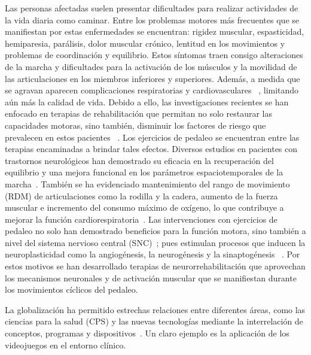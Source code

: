\begin{introduction}
    \vspace{5pt}
    Las personas afectadas suelen presentar dificultades para realizar actividades de la vida diaria como caminar. Entre los problemas motores más frecuentes que se manifiestan por estas enfermedades se encuentran: rigidez muscular, espasticidad, hemiparesia, parálisis, dolor muscular crónico, lentitud en los movimientos y problemas de coordinación y equilibrio. Estos síntomas traen consigo alteraciones de la marcha y dificultades para la activación de los músculos y la movilidad de las articulaciones en los miembros inferiores y superiores. Además, a medida que se agravan aparecen complicaciones respiratorias y cardiovasculares ~\cite{barbosa2015application, miner2020therapeutic}, limitando aún más la calidad de vida. Debido a ello, las investigaciones recientes se han enfocado en terapias de rehabilitación que permitan no solo restaurar las capacidades motoras, sino también, disminuir los factores de riesgo que prevalecen en estos pacientes ~\cite{barbosa2015application}. Los ejercicios de pedaleo se encuentran entre las terapias encaminadas a brindar tales efectos. Diversos estudios en pacientes con trastornos neurológicos han demostrado su eficacia en la recuperación del equilibrio y una mejora funcional en los parámetros espaciotemporales de la marcha~\cite{quiles2020lessons, el2021effect}. También se ha evidenciado mantenimiento del rango de movimiento (RDM) de articulaciones como la rodilla y la cadera, aumento de la fuerza muscular e incremento del consumo máximo de oxígeno, lo que contribuye a mejorar la función cardiorespiratoria~\cite{el2021effect, ashadi2016pengaruh}. Las intervenciones con ejercicios de pedaleo no solo han demostrado beneficios para la función motora, sino también a nivel del sistema nervioso central (SNC)~\cite{linder2019forced, alberts2011not}; pues estimulan procesos que inducen la neuroplasticidad como la angiogénesis, la neurogénesis y la sinaptogénesis ~\cite{linder2019forced, el2021effect}. Por estos motivos se han desarrollado terapias de neurorrehabilitación que aprovechan 
    los mecanismos neuronales y de activación muscular que se manifiestan durante los movimientos cíclicos del pedaleo. 
    
    \vspace{5pt} 
    La globalización ha permitido estrechas relaciones entre diferentes áreas, como las ciencias para la salud (CPS) y las nuevas tecnologías mediante la interrelación de conceptos, programas y dispositivos~\cite{federal2008older}. Un claro ejemplo es la aplicación de los videojuegos en el entorno clínico. 
    

\end{introduction}
